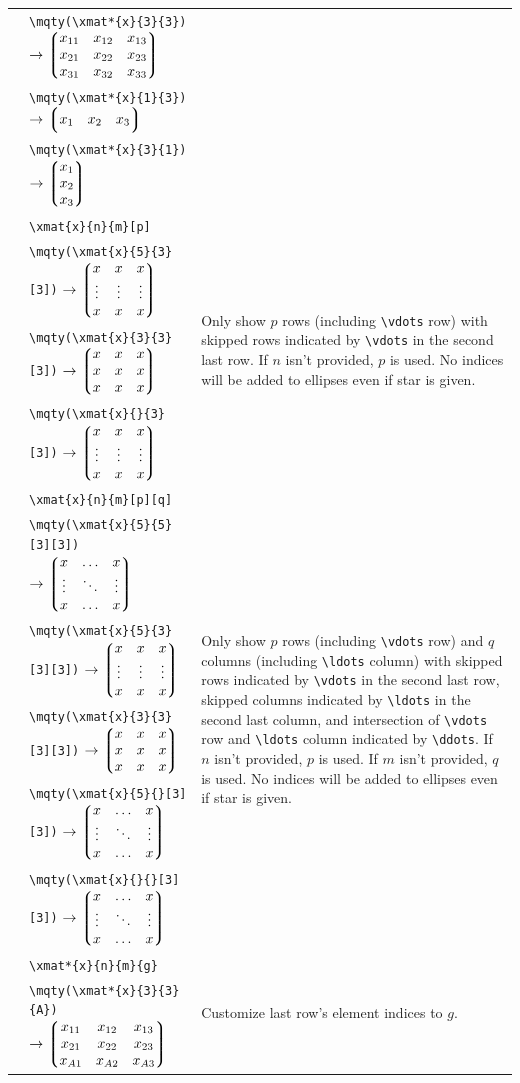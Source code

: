 \documentclass[a4paper,12pt]{article}
\begin{document}
{\begin{longtable}[c]{|p{}|p{}|p{}|}
& \verb|\mqty(\xmat*{x}{3}{3})| $\rightarrow \mqty(\xmat*{x}{3}{3})$ & \\
& \verb|\mqty(\xmat*{x}{1}{3})| $\rightarrow \mqty(\xmat*{x}{1}{3})$ & \\
& \verb|\mqty(\xmat*{x}{3}{1})| $\rightarrow \mqty(\xmat*{x}{3}{1})$ & \\
& \verb|\xmat{x}{n}{m}[p]| & \multirow{4}{*}{\parbox{6cm}{Only show $p$ rows (including \texttt{\textbackslash vdots} row) with skipped rows indicated by \texttt{\textbackslash vdots} in the second last row. If $n$ isn't provided, $p$ is used. No indices will be added to ellipses even if star is given.}} \\
& \verb|\mqty(\xmat{x}{5}{3}[3])| $\rightarrow \mqty(\xmat{x}{5}{3}[3])$ & \\
& \verb|\mqty(\xmat{x}{3}{3}[3])| $\rightarrow \mqty(\xmat{x}{3}{3}[3])$ & \\
& \verb|\mqty(\xmat{x}{}{3}[3])| $\rightarrow \mqty(\xmat{x}{}{3}[3])$ & \\
& \verb|\xmat{x}{n}{m}[p][q]| & \multirow{6}{*}{\parbox{6cm}{Only show $p$ rows (including \texttt{\textbackslash vdots} row) and $q$ columns (including \texttt{\textbackslash ldots} column) with skipped rows indicated by \texttt{\textbackslash vdots} in the second last row, skipped columns indicated by \texttt{\textbackslash ldots} in the second last column, and intersection of \texttt{\textbackslash vdots} row and \texttt{\textbackslash ldots} column indicated by \texttt{\textbackslash ddots}. If $n$ isn't provided, $p$ is used. If $m$ isn't provided, $q$ is used. No indices will be added to ellipses even if star is given.}} \\
& \verb|\mqty(\xmat{x}{5}{5}[3][3])| $\rightarrow \mqty(\xmat{x}{5}{5}[3][3])$ & \\
& \verb|\mqty(\xmat{x}{5}{3}[3][3])| $\rightarrow \mqty(\xmat{x}{5}{3}[3][3])$ & \\
& \verb|\mqty(\xmat{x}{3}{3}[3][3])| $\rightarrow \mqty(\xmat{x}{3}{3}[3][3])$ & \\
& \verb|\mqty(\xmat{x}{5}{}[3][3])| $\rightarrow \mqty(\xmat{x}{5}{}[3][3])$ & \\
& \verb|\mqty(\xmat{x}{}{}[3][3])| $\rightarrow \mqty(\xmat{x}{}{}[3][3])$ & \\
& \verb|\xmat*{x}{n}{m}{g}| & \multirow{3}{*}{\parbox{6cm}{Customize last row's element indices to $g$.}} \\
& \verb|\mqty(\xmat*{x}{3}{3}{A})| $\rightarrow \mqty(\xmat*{x}{3}{3}{A})$ & \\

\end{longtable}}
\end{document}
